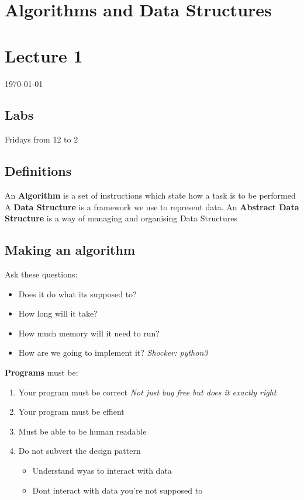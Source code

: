 \documentclass[12pt]{article}
\begin{document}
{\centering
\section*{Algorithms and Data Structures}
\section*{Lecture 1}
\indent\today
}

\subsection*{Labs}
Fridays from 12 to 2
\subsection*{Definitions}
An \textbf{Algorithm} is a set of instructions which state how a task is to be performed
\newline
\newline
A \textbf{Data Structure} is a framework we use to represent data.
\newline
\newline
An \textbf{Abstract Data Structure} is a way of managing and organising Data Structures

\subsection*{Making an algorithm}
Ask these  questions:
\begin{itemize}
    \item Does it do what its supposed to?
    \item How long will it take?
    \item How much memory will it need to run?
    \item How are we going to implement it? \textit{Shocker: python3}
\end{itemize}
\newline
\textbf{Programs} must be:
\begin{enumerate}
    \item Your program must be correct
        \textit{Not just bug free but does it exactly right}
    \item Your program must be effient
    \item Must be able to be human readable
    \item Do not subvert the design pattern
    \begin{itemize}
        \item Understand wyas to interact with data
        \item Dont interact with data you're not supposed to
    \end{itemize}
\end{enumerate}
\end{document}
